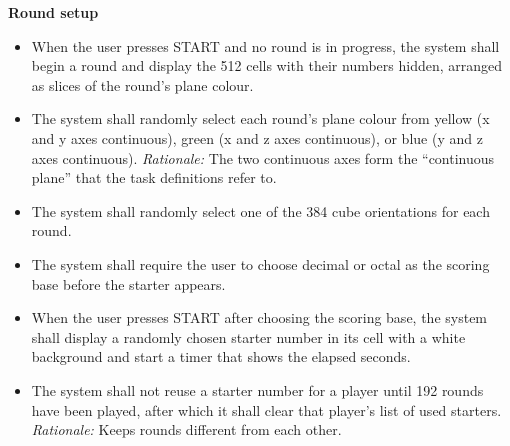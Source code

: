 \documentclass[12pt]{article}
\newcounter{reqnum} %
\begin{document}
\noindent \textbf{Round setup}
\begin{itemize}
 
\item[FR\refstepcounter{reqnum}\thereqnum \label{FR_StartRound}:] When the user presses START and no round is in progress, the system shall begin a round and display the 512 cells with their numbers hidden, arranged as slices of the round's plane colour.
 
\item[FR\refstepcounter{reqnum}\thereqnum \label{FR_SelectPlane}:] The system shall randomly select each round's plane colour from yellow (x and y axes continuous), green (x and z axes continuous), or blue (y and z axes continuous). \newline \textit{Rationale:} The two continuous axes form the ``continuous plane'' that the task definitions refer to.
 
\item[FR\refstepcounter{reqnum}\thereqnum \label{FR_SelectOrientation}:] The system shall randomly select one of the 384 cube orientations for each round.
 
\item[FR\refstepcounter{reqnum}\thereqnum \label{FR_ChooseBase}:] The system shall require the user to choose decimal or octal as the scoring base before the starter appears.
 
\item[FR\refstepcounter{reqnum}\thereqnum \label{FR_ShowStarter}:] When the user presses START after choosing the scoring base, the system shall display a randomly chosen starter number in its cell with a white background and start a timer that shows the elapsed seconds.
 
\item[FR\refstepcounter{reqnum}\thereqnum \label{FR_NoRepeatStarter}:] The system shall not reuse a starter number for a player until 192 rounds have been played, after which it shall clear that player's list of used starters. \newline \textit{Rationale:} Keeps rounds different from each other.
 
\end{itemize}
 
\end{document}
